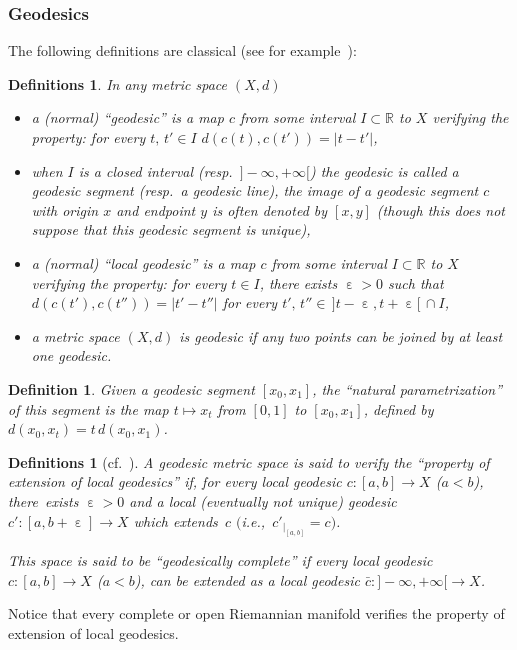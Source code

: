 \documentclass[pdftex]{sigma}
\numberwithin{equation}{section}
\newtheorem{defi}[theor]{Definition}
\newtheorem{defis}[theor]{Definitions}
\newcommand{\R}{\mathbb{R}}
\newcommand{\e}{\operatorname{\varepsilon}}
\begin{document}
\subsubsection{Geodesics}\label{geodesics}
The following definitions are classical (see for example~\cite[D\'efinitions~I.1.3, p.~4]{BH}):
\begin{defis}
In any metric space $ (X,d)$
\begin{itemize}\itemsep=0pt
\item a (normal) ``geodesic'' is a map $c$ from some interval $I \subset \R$ to $X$ verifying the property: for every $ t, \, t' \in I$
$ d(c(t), c(t')) = |t - t'|$,

\item when $I$ is a closed interval (resp.\ $]{-}\infty, + \infty [$) the geodesic is called a geodesic segment
(resp.\ a geodesic line), the image of a geodesic segment $ c $ with origin $x$ and endpoint $y$ is often denoted by $[x, y]$
(though this does not suppose that this geodesic segment is unique),

\item a (normal) ``local geodesic'' is a map $c$ from some interval
$I \subset \R$ to $X$ verifying the property: for every $ t \in I$,
there exists $\e > 0$ such that $ d(c(t'), c(t'')) = |t' - t''|$ for every $ t', \, t'' \in \, ]t- \e, t+ \e[\,\cap I$,

\item a metric space $(X,d)$ is geodesic if any two points can be joined by at least one geodesic.
\end{itemize}
\end{defis}

\begin{defi}\label{naturalparameter}
Given a geodesic segment $[x_0, x_1]$, the ``natural parametrization'' of this segment is the map $t \mapsto x_t$ from $[0, 1]$ to $[x_0, x_1]$,
defined by $d(x_0, x_t) = t \, d(x_0, x_1)$.
\end{defi}

\begin{defis}[{cf.~\cite[Definition~II.5.7, p.~208]{BH}}]\label{geodextension}
A geodesic metric space is said to verify the ``property of extension of local geodesics'' if, for every local geodesic $c \colon [a,b] \to X$ ($a
< b$),
there~exists $\e > 0$ and a local (eventually not unique) geodesic $ c' \colon
[a,b+ \e ] \to X $ which extends~$c$ $\big($i.e.,~$ c'_{|_{[a,b]}} = c\big)$.

This space is said to be ``geodesically complete'' if every local geodesic $c\colon [a,b] \to X$ ($a < b$), can be extended as a local geodesic
$ \bar c\colon ]{-}\infty, +\infty[ {} \to X$.
\end{defis}
Notice that every complete or open Riemannian manifold verifies the property of extension of local geodesics.
\end{document}
